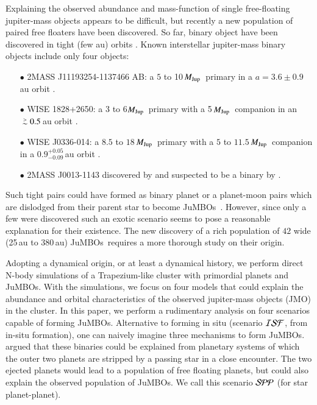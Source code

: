 \documentclass[aa]{lib/aa}
\newcommand{\MJup}{\mbox{${M}_{\rm Jup}$}}
\def\apgt{\ {\raise-.5ex\hbox{$\buildrel>\over\sim$}}\ }
\newcommand{\jumbos}{\mbox{JuMBOs}}
\begin{document}
Explaining the observed abundance and mass-function of single
free-floating jupiter-mass objects appears to be difficult, but
recently a new population of paired free floaters have been
discovered.  So far, binary object have been discovered in tight (few
au) orbits \citep{2021ApJS..253....7K}.  Known interstellar
jupiter-mass binary objects include only four objects:
\begin{itemize}
\item[$\bullet$]2MASS J11193254-1137466 AB: a $5$ to 10\,\MJup\,
  primary in a $a=3.6\pm0.9$\,au orbit \citep{2017ApJ...843L...4B}.
\item[$\bullet$]WISE 1828+2650: a 3 to 6\MJup\, primary with a
  5\,\MJup\ companion in an $\apgt 0.5$\,au orbit
  \citep{2013ApJ...764..101B}.
\item[$\bullet$] WISE J0336-014: a $8.5$ to
  $18$\,\MJup\ primary with a $5$ to $11.5$\,\MJup\, companion in a
  $0.9^{+0.05}_{-0.09}$\,au orbit \citep{2023ApJ...947L..30C}.
\item[$\bullet$]2MASS J0013-1143 discovered by \citep{2017AJ....154..112K} and
  suspected to be a binary by \citep{2019A&A...629A.145E}.
\end{itemize}

Such tight pairs could have formed as binary planet or a planet-moon
pairs which are dislodged from their parent star to become \jumbos\,
\citep{2016ApJ...819..125C}.  However, since only a few were
discovered such an exotic scenario seems to pose a reasonable
explanation for their existence.  The new discovery of a rich
population of $42$ wide (25\,au to 380\,au) \jumbos\,
\citep{2023arXiv231001231P} requires a more thorough study on their
origin.

Adopting a dynamical origin, or at least a dynamical history, we
perform direct N-body simulations of a Trapezium-like cluster with
primordial planets and \jumbos. With the simulations, we focus on four
models that could explain the abundance and orbital characteristics of
the observed jupiter-mass objects (JMO) in the cluster. In this paper,
we perform a rudimentary analysis on four scenarios capable of forming
\jumbos.  Alternative to forming in situ (scenario ${\cal ISF}$, from
in-situ formation), one can naively imagine three mechanisms to form
\jumbos. \citep{2023arXiv231006016W} argued that these binaries could
be explained from planetary systems of which the outer two planets are
stripped by a passing star in a close encounter. The two ejected
planets would lead to a population of free floating planets, but could
also explain the observed population of \jumbos.  We call this
scenario ${\cal SPP}$ (for star planet-planet).
\end{document}

